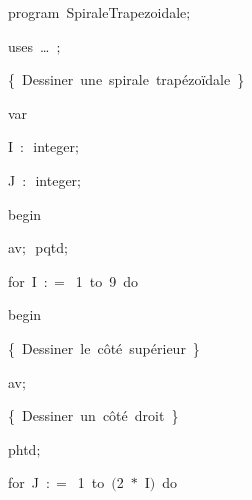 
{
\parindent {}
\medskip

\carrenoir
\vspace{\neglskip}\mbox{\blc  \idt  \mcl program\idt \label{prog:SpiraleTrapezoidale}\ SpiraleTrapezoidale$;$
}\par 
\vspace{\neglskip}\mbox{\blc \blk\idt \mcl uses\idt \ \ldots\ $;$
}\par 
\vspace{\neglskip}\mbox{\blc  \blk\idt  \cmt  \{\ Dessiner\ une\ spirale\ trapézoïdale\ \}\idt }\par 
\pagebreak[3] 
\vspace{\neglskip}\mbox{\blc  \blk\idt  \mcl var\idt }\par 
\vspace{\neglskip}\mbox{\blc  \blk\blk\idt  I\ $:$\ integer$;$}\par 
\vspace{\neglskip}\mbox{\blc  \blk\blk\idt  J\ $:$\ integer$;$}\par 
\vspace{\neglskip}\mbox{\blc  \idt  \mcl begin\idt }\par 
\vspace{\neglskip}\mbox{\blc  \blk\idt  av$;$\ pqtd$;$\ }\par 
\pagebreak[3] 
\vspace{\neglskip}\mbox{\blc  \blk\idt  \mcl for\idt \ I\ $:$$=$\ 1\ \mcl to\idt \ 9\ \mcl do\idt }\par 
\vspace{\neglskip}\mbox{\blc  \blk\blk\idt  \mcl begin\idt }\par 
\vspace{\neglskip}\mbox{\blc  \blk\blk\blk\idt  \cmt  \{\ Dessiner\ le\ côté\ supérieur\ \}\idt }\par 
\vspace{\neglskip}\mbox{\blc  \blk\blk\blk\idt  av$;$\ }\par 
\vspace{\neglskip}\mbox{\blc  \blk\blk\blk\idt  \cmt  \{\ Dessiner\ un\ côté\ droit\ \}\idt }\par 
\vspace{\neglskip}\mbox{\blc  \blk\blk\blk\idt  phtd$;$\ }\par 
\pagebreak[3] 
\vspace{\neglskip}\mbox{\blc  \blk\blk\blk\idt  \mcl for\idt \ J\ $:$$=$\ 1\ \mcl to\idt \ $($2\ $\ast$\ I$)$\ \mcl do\idt }\par 
}
